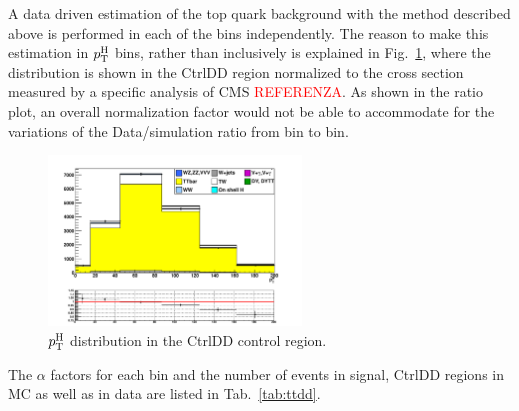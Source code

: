 A data driven estimation of the top quark background with the method described above is performed in each of the \pth bins independently. The reason to make this estimation in $p_\mathrm{T}^\mathrm{H}$ bins, rather than inclusively is explained in Fig.~\ref{fig:ttpth}, where the \pth distribution is shown in the CtrlDD region normalized to the cross section measured by a specific analysis of CMS \textcolor{red}{REFERENZA}. As shown in the ratio plot, an overall normalization factor would not be able to accommodate for the variations of the Data/simulation ratio from bin to bin.

\begin{figure}[b]
\centering
\includegraphics[width=0.6\textwidth]{images/ttpth.pdf}
\caption{$p_\mathrm{T}^\mathrm{H}$ distribution in the CtrlDD control region.\label{fig:ttpth}}
\end{figure}

The $\alpha$ factors for each bin and the number of events in signal, CtrlDD regions in MC as well as in data are listed in Tab.~\ref{tab:ttdd}.

